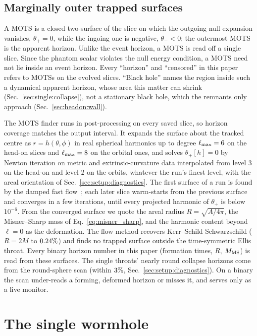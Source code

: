 \documentclass[twocolumn,floatfix,aps,prd,superscriptaddress,nofootinbib]{revtex4-2}
\begin{document}
\subsection{Marginally outer trapped surfaces}
\label{sec:setup:mots}

A MOTS is a closed two-surface of the slice on which the outgoing null expansion vanishes, $\theta_+=0$, while
the ingoing one is negative, $\theta_-<0$; the outermost MOTS is the apparent horizon. Unlike the event
horizon, a MOTS is read off a single slice. Since the phantom scalar violates the null energy condition, a MOTS
need not lie inside an event horizon. Every ``horizon'' and ``censored'' in this paper refers to MOTSs on the
evolved slices. ``Black hole'' names the region inside such a dynamical apparent horizon, whose area this matter can shrink (Sec.~\ref{sec:single:collapse}), not a stationary black hole, which the remnants only approach (Sec.~\ref{sec:headon:wall}).

The MOTS finder runs in post-processing on every saved slice, so horizon coverage matches the output interval. It
expands the surface about the tracked centre as $r=h(\theta,\phi)$ in real spherical harmonics up to degree
$\ell_{\max}=6$ on the head-on slices and $\ell_{\max}=8$ on the orbital
ones, and solves $\theta_+[h]=0$ by Newton iteration on metric and extrinsic-curvature data interpolated from
level 3 on the head-on and level 2 on the orbits, whatever the run's finest level, with the areal orientation of
Sec.~\ref{sec:setup:diagnostics}. The first surface of a run is found by the damped fast
flow~\cite{gundlach1998}; each later slice warm-starts from the previous surface and converges in a few
iterations, until every projected harmonic of $\theta_+$ is below $10^{-6}$. From the converged surface
we quote the areal radius $R=\sqrt{A/4\pi}$, the Misner--Sharp mass of Eq.~\eqref{eq:misner_sharp}, and the
harmonic content beyond $\ell=0$ as the deformation. The flow method recovers Kerr--Schild Schwarzschild
($R=2M$ to $0.24\%$) and finds no trapped surface outside the time-symmetric Ellis throat. Every
binary horizon number in this paper (formation times, $R$, $M_{\rm MS}$) is read from these surfaces. The single
throats' nearly round collapse horizons come from the round-sphere scan (within $3\%$,
Sec.~\ref{sec:setup:diagnostics}). On a binary the scan under-reads a forming, deformed horizon or misses it, and
serves only as a live monitor.

\section{The single wormhole}
\label{sec:single}
\end{document}
